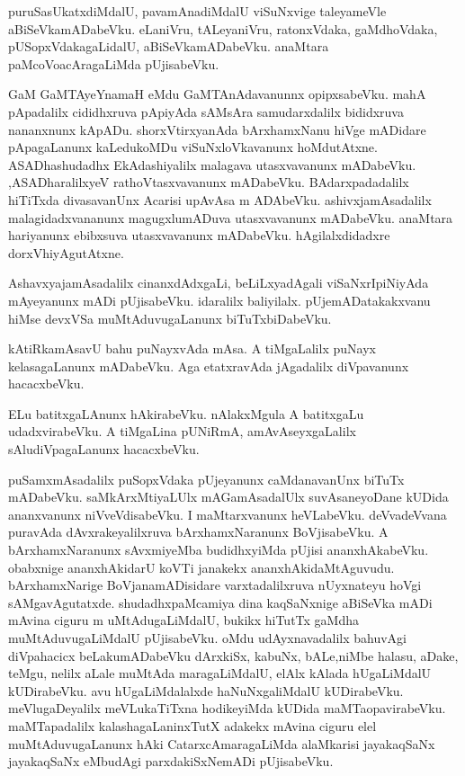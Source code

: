 \documentclass{article}
\begin{document}
\begin{mn}%
puruSasUkatxdiMdalU, pavamAnadiMdalU viSuNxvige taleyameVle aBiSeVkamADabeVku. eLaniVru, 
tALeyaniVru, ratonxVdaka, gaMdhoVdaka, pUSopxVdakagaLidalU, aBiSeVkamADabeVku. anaMtara 
paMcoVoacAragaLiMda pUjisabeVku.
\end{mn}

\begin{mn}%
GaM GaMTAyeYnamaH eMdu GaMTAnAdavanunnx opipxsabeVku. mahA pApadalilx cididhxruva pApiyAda 
sAMsAra samudarxdalilx bididxruva nananxnunx kApADu. shorxVtirxyanAda bArxhamxNanu hiVge 
mADidare pApagaLanunx kaLedukoMDu viSuNxloVkavanunx hoMdutAtxne. ASADhashudadhx 
EkAdashiyalilx malagava utasxvavanunx mADabeVku. ,ASADharalilxyeV rathoVtasxvavanunx 
mADabeVku. BAdarxpadadalilx hiTiTxda divasavanUnx Acarisi upAvAsa m ADAbeVku. 
ashivxjamAsadalilx malagidadxvananunx magugxlumADuva utasxvavanunx mADabeVku. anaMtara 
hariyanunx ebibxsuva utasxvavanunx mADabeVku. hAgilalxdidadxre dorxVhiyAgutAtxne.
\end{mn}

\begin{mn}%
AshavxyajamAsadalilx cinanxdAdxgaLi, beLiLxyadAgali viSaNxrIpiNiyAda mAyeyanunx mADi 
pUjisabeVku. idaralilx baliyilalx. pUjemADatakakxvanu hiMse devxVSa muMtAduvugaLanunx 
biTuTxbiDabeVku.
\end{mn}

\begin{mn}%
kAtiRkamAsavU bahu puNayxvAda mAsa. A tiMgaLalilx puNayx kelasagaLanunx mADabeVku. Aga
etatxravAda jAgadalilx diVpavanunx hacacxbeVku.
\end{mn}

\begin{mn}%
ELu batitxgaLAnunx hAkirabeVku. nAlakxMgula A batitxgaLu udadxvirabeVku. A tiMgaLina 
pUNiRmA, amAvAseyxgaLalilx sAludiVpagaLanunx hacacxbeVku.
\end{mn}

\begin{mn}%
puSamxmAsadalilx puSopxVdaka pUjeyanunx caMdanavanUnx biTuTx mADabeVku. saMkArxMtiyaLUlx 
mAGamAsadalUlx suvAsaneyoDane kUDida ananxvanunx niVveVdisabeVku. I maMtarxvanunx 
heVLabeVku. deVvadeVvana puravAda dAvxrakeyalilxruva bArxhamxNaranunx BoVjisabeVku. A 
bArxhamxNaranunx  sAvxmiyeMba budidhxyiMda pUjisi ananxhAkabeVku. obabxnige ananxhAkidarU 
koVTi janakekx ananxhAkidaMtAguvudu. bArxhamxNarige BoVjanamADisidare varxtadalilxruva 
nUyxnateyu hoVgi sAMgavAgutatxde. shudadhxpaMcamiya dina kaqSaNxnige aBiSeVka mADi mAvina 
ciguru m uMtAdugaLiMdalU, bukikx hiTutTx gaMdha muMtAduvugaLiMdalU pUjisabeVku. oMdu 
udAyxnavadalilx bahuvAgi diVpahacicx beLakumADabeVku dArxkiSx, kabuNx, bALe,niMbe halasu, 
aDake, teMgu, nelilx aLale muMtAda maragaLiMdalU, elAlx kAlada hUgaLiMdalU kUDirabeVku.
avu hUgaLiMdalalxde haNuNxgaliMdalU kUDirabeVku. meVlugaDeyalilx meVLukaTiTxna hodikeyiMda 
kUDida maMTaopavirabeVku. maMTapadalilx kalashagaLaninxTutX adakekx mAvina ciguru elel 
muMtAduvugaLanunx hAki CatarxcAmaragaLiMda alaMkarisi jayakaqSaNx jayakaqSaNx eMbudAgi 
parxdakiSxNemADi pUjisabeVku.
\end{mn}
\end{document}
